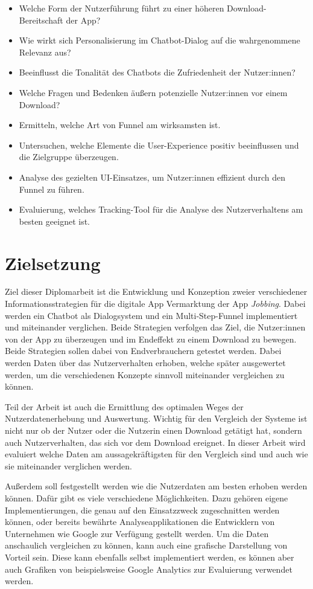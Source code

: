 \begin{itemize}
    \item Welche Form der Nutzerführung führt zu einer höheren
    Download-Bereitschaft der App?
    \item Wie wirkt sich Personalisierung im Chatbot-Dialog auf
    die wahrgenommene Relevanz aus?
    \item Beeinflusst die Tonalität des Chatbots die
    Zufriedenheit der Nutzer:innen?
    \item Welche Fragen und Bedenken äußern potenzielle
    Nutzer:innen vor einem Download?
    \item Ermitteln, welche Art von Funnel am wirksamsten ist.
    \item Untersuchen, welche Elemente die User-Experience positiv beeinflussen und die Zielgruppe überzeugen.
    \item Analyse des gezielten UI-Einsatzes, um Nutzer:innen effizient durch den Funnel zu führen.
    \item Evaluierung, welches Tracking-Tool für die Analyse des Nutzerverhaltens am besten geeignet ist.
\end{itemize}

\section{Zielsetzung}

Ziel dieser Diplomarbeit ist die Entwicklung und Konzeption zweier verschiedener
Informationsstrategien für die digitale App Vermarktung der App \textit{Jobbing}.
Dabei werden ein Chatbot als Dialogsystem und ein Multi-Step-Funnel implementiert und
miteinander verglichen.
Beide Strategien verfolgen das Ziel, die Nutzer:innen von der App zu überzeugen und im Endeffekt
zu einem Download zu bewegen. Beide Strategien sollen dabei von Endverbrauchern getestet 
werden. Dabei werden Daten über das Nutzerverhalten erhoben, welche später ausgewertet werden,
um die verschiedenen Konzepte sinnvoll miteinander vergleichen zu können.

Teil der Arbeit ist auch die Ermittlung des optimalen Weges der Nutzerdatenerhebung und Auswertung.
Wichtig für den Vergleich der Systeme ist nicht nur ob der Nutzer oder die Nutzerin einen Download getätigt
hat, sondern auch Nutzerverhalten, das sich vor dem Download ereignet. In dieser Arbeit wird
evaluiert welche Daten am aussagekräftigsten für den Vergleich sind und auch wie sie 
miteinander verglichen werden.

Außerdem soll festgestellt werden wie die Nutzerdaten am besten erhoben werden können. 
Dafür gibt es viele verschiedene Möglichkeiten. Dazu gehören eigene Implementierungen, 
die genau auf den Einsatzzweck zugeschnitten werden können, oder bereits bewährte 
Analyseapplikationen die Entwicklern von Unternehmen wie Google zur Verfügung gestellt
werden. Um die Daten anschaulich vergleichen zu können, kann auch eine grafische Darstellung
von Vorteil sein. Diese kann ebenfalls selbst implementiert werden, es können aber auch
Grafiken von beispielsweise Google Analytics zur Evaluierung verwendet werden.

